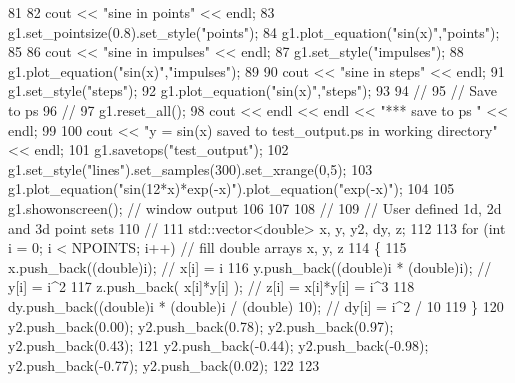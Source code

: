 \begin{DoxyCode}
81 
82         cout << \textcolor{stringliteral}{"sine in points"} << endl;
83         g1.set\_pointsize(0.8).set\_style(\textcolor{stringliteral}{"points"});
84         g1.plot\_equation(\textcolor{stringliteral}{"sin(x)"},\textcolor{stringliteral}{"points"});
85 
86         cout << \textcolor{stringliteral}{"sine in impulses"} << endl;
87         g1.set\_style(\textcolor{stringliteral}{"impulses"});
88         g1.plot\_equation(\textcolor{stringliteral}{"sin(x)"},\textcolor{stringliteral}{"impulses"});
89 
90         cout << \textcolor{stringliteral}{"sine in steps"} << endl;
91         g1.set\_style(\textcolor{stringliteral}{"steps"});
92         g1.plot\_equation(\textcolor{stringliteral}{"sin(x)"},\textcolor{stringliteral}{"steps"});
93 
94         \textcolor{comment}{//}
95         \textcolor{comment}{// Save to ps}
96         \textcolor{comment}{//}
97         g1.reset\_all();
98         cout << endl << endl << \textcolor{stringliteral}{"*** save to ps "} << endl;
99 
100         cout << \textcolor{stringliteral}{"y = sin(x) saved to test\_output.ps in working directory"} << endl;
101         g1.savetops(\textcolor{stringliteral}{"test\_output"});
102         g1.set\_style(\textcolor{stringliteral}{"lines"}).set\_samples(300).set\_xrange(0,5);
103         g1.plot\_equation(\textcolor{stringliteral}{"sin(12*x)*exp(-x)"}).plot\_equation(\textcolor{stringliteral}{"exp(-x)"});
104 
105         g1.showonscreen(); \textcolor{comment}{// window output}
106 
107 
108         \textcolor{comment}{//}
109         \textcolor{comment}{// User defined 1d, 2d and 3d point sets}
110         \textcolor{comment}{//}
111         std::vector<double> x, y, y2, dy, z;
112 
113         \textcolor{keywordflow}{for} (\textcolor{keywordtype}{int} i = 0; i < NPOINTS; i++)  \textcolor{comment}{// fill double arrays x, y, z}
114         \{
115             x.push\_back((\textcolor{keywordtype}{double})i);             \textcolor{comment}{// x[i] = i}
116             y.push\_back((\textcolor{keywordtype}{double})i * (\textcolor{keywordtype}{double})i); \textcolor{comment}{// y[i] = i^2}
117             z.push\_back( x[i]*y[i] );           \textcolor{comment}{// z[i] = x[i]*y[i] = i^3}
118             dy.push\_back((\textcolor{keywordtype}{double})i * (\textcolor{keywordtype}{double})i / (\textcolor{keywordtype}{double}) 10); \textcolor{comment}{// dy[i] = i^2 / 10}
119         \}
120         y2.push\_back(0.00); y2.push\_back(0.78); y2.push\_back(0.97); y2.push\_back(0.43);
121         y2.push\_back(-0.44); y2.push\_back(-0.98); y2.push\_back(-0.77); y2.push\_back(0.02);
122 
123 

\end{DoxyCode}
